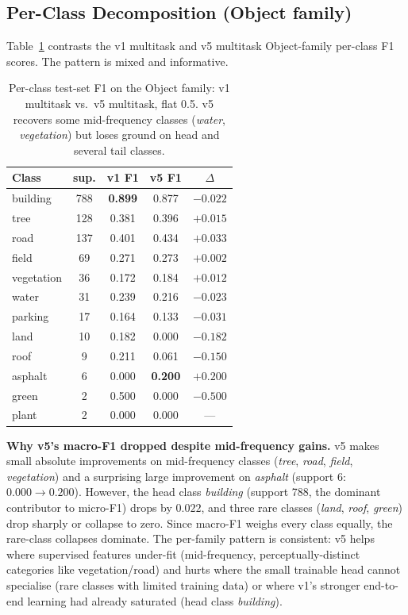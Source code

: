 \documentclass[journal]{IEEEtran}
\begin{document}
\subsection{Per-Class Decomposition (Object family)}\label{ssec:perclass}

Table~\ref{tab:object-classes} contrasts the v1 multitask and v5 multitask Object-family per-class F1 scores. The pattern is mixed and informative.

\begin{table}[!t]
  \caption{Per-class test-set F1 on the Object family: v1 multitask vs.\ v5 multitask, flat 0.5. v5 recovers some mid-frequency classes (\emph{water}, \emph{vegetation}) but loses ground on head and several tail classes.}
  \label{tab:object-classes}
  \centering
  \small
  \begin{tabular}{@{}lcccc@{}}
  \toprule
  Class & sup. & v1 F1 & v5 F1 & $\Delta$ \\
  \midrule
  building   & 788 & \textbf{0.899} & 0.877 & $-0.022$ \\
  tree       & 128 & 0.381 & 0.396 & $+0.015$ \\
  road       & 137 & 0.401 & 0.434 & $+0.033$ \\
  field      &  69 & 0.271 & 0.273 & $+0.002$ \\
  vegetation &  36 & 0.172 & 0.184 & $+0.012$ \\
  water      &  31 & 0.239 & 0.216 & $-0.023$ \\
  parking    &  17 & 0.164 & 0.133 & $-0.031$ \\
  land       &  10 & 0.182 & 0.000 & $-0.182$ \\
  roof       &   9 & 0.211 & 0.061 & $-0.150$ \\
  asphalt    &   6 & 0.000 & \textbf{0.200} & $+0.200$ \\
  green      &   2 & 0.500 & 0.000 & $-0.500$ \\
  plant      &   2 & 0.000 & 0.000 & ---       \\
  \bottomrule
  \end{tabular}
\end{table}

\textbf{Why v5's macro-F1 dropped despite mid-frequency gains.} v5 makes small absolute improvements on mid-frequency classes (\emph{tree}, \emph{road}, \emph{field}, \emph{vegetation}) and a surprising large improvement on \emph{asphalt} (support 6: $0.000{\to}0.200$). However, the head class \emph{building} (support 788, the dominant contributor to micro-F1) drops by $0.022$, and three rare classes (\emph{land}, \emph{roof}, \emph{green}) drop sharply or collapse to zero. Since macro-F1 weighs every class equally, the rare-class collapses dominate. The per-family pattern is consistent: v5 helps where supervised features under-fit (mid-frequency, perceptually-distinct categories like vegetation/road) and hurts where the small trainable head cannot specialise (rare classes with limited training data) or where v1's stronger end-to-end learning had already saturated (head class \emph{building}).
\end{document}
